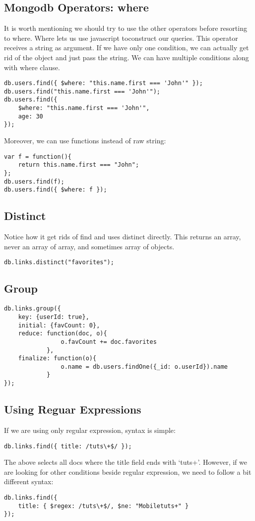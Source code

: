 \documentclass[a4paper, 12pt]{article}
\begin{document}
\subsection{Mongodb Operators: where}
It is worth mentioning we should try to use the other operators before resorting to where. Where lets us use javascript toconstruct our queries. This operator receives a string as argument. If we have only one condition, we can actually get rid of the object and just pass the string. We can have multiple conditions along with where clause.
\begin{verbatim}
db.users.find({ $where: "this.name.first === 'John'" });
db.users.find("this.name.first === 'John'");
db.users.find({ 
	$where: "this.name.first === 'John'", 
	age: 30 
});
\end{verbatim}
Moreover, we can use functions instead of raw string:
\begin{verbatim}
var f = function(){
	return this.name.first === "John";
};
db.users.find(f);
db.users.find({ $where: f });
\end{verbatim}
\subsection{Distinct}
Notice how it get rids of find and uses distinct directly. This returns an array, never an array of array, and sometimes array of objects.
\begin{verbatim}
db.links.distinct("favorites");
\end{verbatim}
\subsection{Group}
\begin{verbatim}
db.links.group({
	key: {userId: true},
	initial: {favCount: 0},
	reduce: function(doc, o){
				o.favCount += doc.favorites
			},
	finalize: function(o){
				o.name = db.users.findOne({_id: o.userId}).name
			}
});
\end{verbatim}
\subsection{Using Reguar Expressions}
If we are using only regular expression, syntax is simple:
\begin{verbatim}
db.links.find({ title: /tuts\+$/ });
\end{verbatim}
The above selects all docs where the title field ends with `tuts+'. However, if we are looking for other conditions beside regular expression, we need to follow a bit different syntax:
\begin{verbatim}
db.links.find({ 
	title: { $regex: /tuts\+$/, $ne: "Mobiletuts+" } 
});
\end{verbatim}
\end{document}
